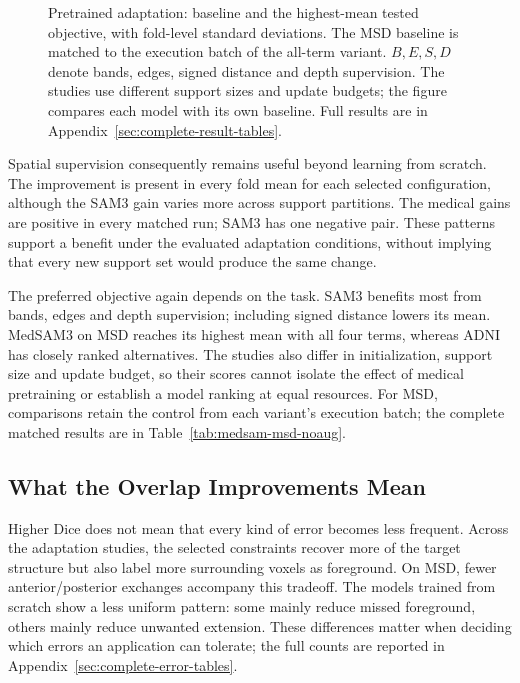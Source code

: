 \documentclass[12pt,a4paper]{article}
\begin{document}
\begin{figure}[htbp]
\caption{Pretrained adaptation:
baseline and the highest-mean tested objective, with fold-level standard
deviations. The MSD baseline is matched to the execution batch of the
all-term variant. $B,E,S,D$ denote bands, edges, signed distance and depth
supervision. The studies use different support sizes and update budgets;
the figure compares each model with its own baseline. Full results are in
Appendix~\ref{sec:complete-result-tables}.}
\label{fig:adaptation-key-results}
\end{figure}

Spatial supervision consequently remains useful beyond learning from
scratch. The improvement is present in every fold mean for each selected
configuration, although the SAM3 gain varies more across support
partitions. The medical gains are positive in every matched run; SAM3
has one negative pair. These patterns support a benefit under the
evaluated adaptation conditions, without implying that every new support
set would produce the same change.

The preferred objective again depends on the task. SAM3 benefits most
from bands, edges and depth supervision; including signed distance lowers
its mean. MedSAM3 on MSD reaches its highest mean with all four terms,
whereas ADNI has closely ranked alternatives. The studies also differ in
initialization, support size and update budget, so their scores cannot
isolate the effect of medical pretraining or establish a model ranking at
equal resources. For MSD, comparisons retain the control from each
variant's execution batch; the complete matched results are in
Table~\ref{tab:medsam-msd-noaug}.

\FloatBarrier
\subsection{What the Overlap Improvements Mean}
\label{sec:error-analysis}\label{sec:capped-errors-resources}
\label{sec:background-dice-results}

Higher Dice does not mean that every kind of error becomes less frequent.
Across the adaptation studies, the selected constraints recover more of
the target structure but also label more surrounding voxels as foreground.
On MSD, fewer anterior/posterior exchanges accompany this tradeoff.
The models trained from scratch show a less uniform pattern: some mainly
reduce missed foreground, others mainly reduce unwanted extension. These
differences matter when deciding which errors an application can tolerate;
the full counts are reported in Appendix~\ref{sec:complete-error-tables}.
\end{document}
